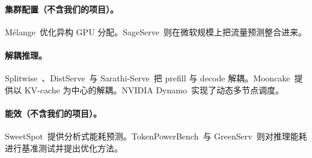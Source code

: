 \paragraph{集群配置（不含我们的项目）。}
M\'{e}lange~\cite{griggs2024melange}优化异构 GPU 分配。SageServe~\cite{jia2025sageserve}则在微软规模上把流量预测整合进来。

\paragraph{解耦推理。}
Splitwise~\cite{patel2024splitwise}、DistServe~\cite{zhong2024distserve}与 Sarathi-Serve~\cite{agrawal2024sarathi}把 prefill 与 decode 解耦。Mooncake~\cite{qin2025mooncake}提供以 KV-cache 为中心的解耦。NVIDIA Dynamo~\cite{nvidia2026dynamo}实现了动态多节点调度。

\paragraph{能效（不含我们的项目）。}
SweetSpot~\cite{patel2026sweetspot}提供分析式能耗预测。TokenPowerBench~\cite{niu2025tokenpowerbench}与 GreenServ~\cite{greenserv2026}则对推理能耗进行基准测试并提出优化方法。
